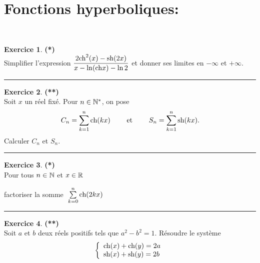\documentclass[a4paper,11pt]{article}
\theoremstyle{definition}
\newtheorem{exo}{Exercice} %
\begin{document}
\section*{Fonctions hyperboliques:}\hfill\\%
\begin{minipage}{1\linewidth}
	\begin{minipage}[t]{0.48\linewidth}
		\raggedright
		
		
		\begin{exo}\textbf{(*)}\quad\\[0.2cm]
			Simplifier l'expression $\displaystyle\frac{2\text{ch}^2(x)-\text{sh}(2x)}{x-\ln(\text{ch} x)-\ln 2}$ 
			et donner ses limites en $-\infty$ et $+\infty$.
			
			\centering
			\rule{1\linewidth}{0.6pt}
		\end{exo}
		
		
		\begin{exo}\textbf{(**)}\quad\\[0.2cm]
			Soit $x$ un réel fixé. Pour $n\in\mathbb{N}^*$, on pose
			$$C_n=\sum_{k=1}^n\text{ch}(kx)\qquad\text{ et }\qquad S_n=\sum_{k=1}^n\text{sh}(kx).$$
			Calculer $C_n$ et $S_n$.
			
			\centering
			\rule{1\linewidth}{0.6pt}
		\end{exo}
		
			\begin{exo}\textbf{(*)}\quad\\[0.2cm]%
			Pour tous $n \in \mathbb{N}$ et $x \in \mathbb{R}$
			
			factoriser la somme $ \ \sum\limits_{k=0}^{n} \ch(2kx)$
			
			
			
			\centering
			\rule{1\linewidth}{0.6pt}
		\end{exo}
		
		
	\end{minipage}	
	\hfill\vrule\hfill
	\begin{minipage}[t]{0.48\linewidth}
		\raggedright
		
	
		
		
		
		\begin{exo}\textbf{(**)}\quad\\[0.2cm]
			Soit $a$ et $b$ deux réels positifs tels que $a^2-b^2=1$. Résoudre le système
			$$\left\{\begin{array}{l}
			\text{ch}(x)+\text{ch}(y)=2a\\
			\text{sh}(x)+\text{sh}(y)=2b
			\end{array}\right.$$
			

\end{exo}
\end{minipage}
\end{minipage}
\end{document}

